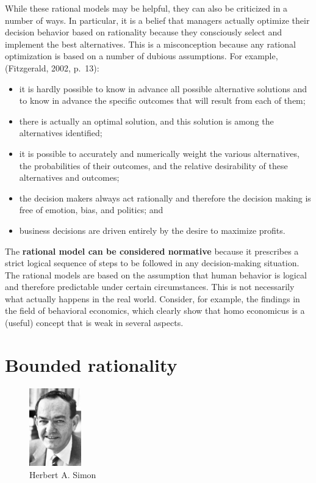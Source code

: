 \documentclass[
  12pt,
  oneside]{book}
\providecommand{\tightlist}{%
  \setlength{\itemsep}{0pt}\setlength{\parskip}{0pt}}
\theoremstyle{definition}
\theoremstyle{definition}
\theoremstyle{definition}
\theoremstyle{definition}
\theoremstyle{remark}
\begin{document}
While these rational models may be helpful, they can also be criticized in a number of ways. In particular, it is a belief that managers actually optimize their decision behavior based on rationality because they consciously select and implement the best alternatives. This is a misconception because any rational optimization is based on a number of dubious assumptions. For example, (Fitzgerald, 2002, p.~13):

\begin{itemize}
\tightlist
\item
  it is hardly possible to know in advance all possible alternative solutions and to know in advance the specific outcomes that will result from each of them;
\item
  there is actually an optimal solution, and this solution is among the alternatives identified;
\item
  it is possible to accurately and numerically weight the various alternatives, the probabilities of their outcomes, and the relative desirability of these alternatives and outcomes;
\item
  the decision makers always act rationally and therefore the decision making is free of emotion, bias, and politics; and
\item
  business decisions are driven entirely by the desire to maximize profits.
\end{itemize}

The \textbf{rational model can be considered normative} because it prescribes a strict logical sequence of steps to be followed in any decision-making situation. The rational models are based on the assumption that human behavior is logical and therefore predictable under certain circumstances. This is not necessarily what actually happens in the real world. Consider, for example, the findings in the field of behavioral economics, which clearly show that homo economicus is a (useful) concept that is weak in several aspects.

\hypertarget{bounded-rationality}{%
\section{Bounded rationality}\label{bounded-rationality}}

\begin{figure}
\centering
\includegraphics[width=0.2\textwidth,height=\textheight]{fig/herbert-simon.jpg}
\caption[\label{fig:simon} Herbert A. Simon]{\label{fig:simon} Herbert A. Simon\footnotemark{}}
\end{figure}
\end{document}
